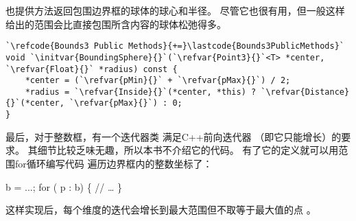 也提供方法返回包围边界框的球体的球心和半径。
尽管它也很有用，但一般这样给出的范围会比直接包围所含内容的球体松弛得多。
\begin{lstlisting}
`\refcode{Bounds3 Public Methods}{+=}\lastcode{Bounds3PublicMethods}`
void `\initvar{BoundingSphere}{}`(`\refvar{Point3}{}`<T> *center, `\refvar{Float}{}` *radius) const {
    *center = (`\refvar{pMin}{}` + `\refvar{pMax}{}`) / 2;
    *radius = `\refvar{Inside}{}`(*center, *this) ? `\refvar{Distance}{}`(*center, `\refvar{pMax}{}`) : 0;
}
\end{lstlisting}

最后，对于整数框，有一个迭代器类
满足C++前向迭代器
（即它只能增长）的要求。
其细节比较乏味无趣，所以本书不介绍它的代码。
有了它的定义就可以用范围{\ttfamily for}循环编写代码
遍历边界框内的整数坐标了：

{\ttfamily\indent {} b = ...;}\newline
{\ttfamily\indent for ( p : b) \{}\newline
{\ttfamily\indent \qquad//  …}\newline
{\ttfamily\indent \}}

这样实现后，每个维度的迭代会增长到最大范围但不取等于最大值的点
。